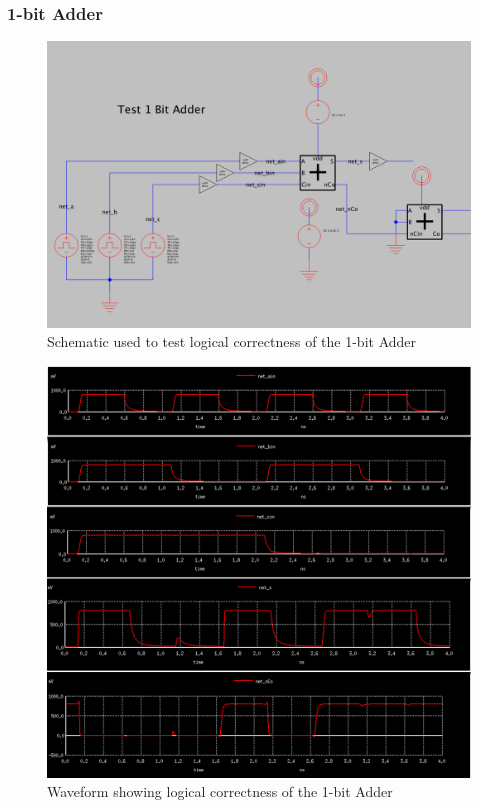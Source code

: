 \documentclass{article}
\begin{document}
\subsubsection{1-bit Adder}
\begin{figure}[H]
  \includegraphics[width=\linewidth]{opt_screenshots/test_logic_1b_adder_sch.png}
  \caption{Schematic used to test logical correctness of the 1-bit Adder}
  \label{fig:test_logic_1b_adder_sch}
\end{figure}

\begin{figure}[H]
  \includegraphics[width=\linewidth]{opt_screenshots/test_logic_1b_adder.png}
  \caption{Waveform showing logical correctness of the 1-bit Adder}
  \label{fig:test_logic_1b_adder}
\end{figure}
\end{document}
